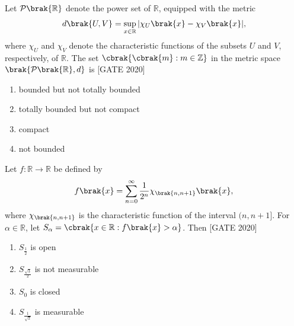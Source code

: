 \iffalse
\title{2020-MA}
\author{EE24BTECH11020 -  Ellanti Rohith}
\section{ma}
\chapter{2020}
\fi
    \item  Let $\mathcal{P}\brak{\mathbb{R}}$ denote the power set of $\mathbb{R}$, equipped with the metric
    \begin{align*}
    d\brak{U, V} = \sup_{x \in \mathbb{R}} | \chi_U\brak{x} - \chi_V\brak{x} |,
    \end{align*}
    where $\chi_U$ and $\chi_V$ denote the characteristic functions of the subsets $U$ and $V$, respectively, of $\mathbb{R}$. The set $\cbrak{\cbrak{m} : m \in \mathbb{Z}}$ in the metric space $\brak{\mathcal{P}\brak{\mathbb{R}}, d}$ is
    \hfill{[GATE 2020]}\begin{multicols}{2}\begin{enumerate}
        \item bounded but not totally bounded
        \item totally bounded but not compact
        \item compact
        \item not bounded
    \end{enumerate}\end{multicols}

    \item  Let $f : \mathbb{R} \to \mathbb{R}$ be defined by
    \begin{align*}
    f\brak{x} = \sum_{n=0}^{\infty} \frac{1}{2^n} \chi_{\brak{n, n+1}}\brak{x},
    \end{align*}
    where $\chi_{\brak{n, n+1}}$ is the characteristic function of the interval $(n, n+1]$. For $\alpha \in \mathbb{R}$, let $S_\alpha = \cbrak{ x \in \mathbb{R} : f\brak{x} > \alpha }$. Then
    \hfill{[GATE 2020]}\begin{multicols}{2}\begin{enumerate}
        \item $S_{\frac{1}{2}}$ is open
        \item $S_{\frac{\sqrt{3}}{2}}$ is not measurable
        \item $S_0$ is closed
        \item $S_{\frac{1}{\sqrt{2}}}$ is measurable
    \end{enumerate}\end{multicols}

